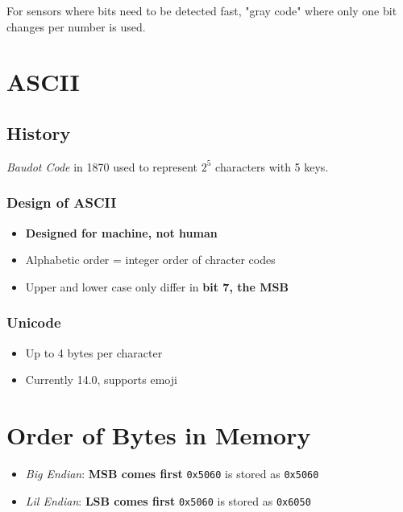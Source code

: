 \documentclass[11pt]{article}
\begin{document}
For sensors where bits need to be detected fast, "gray code" where only one bit changes per number is used.

\section{ASCII}
\label{sec:org69314f6}

\subsection{History}
\label{sec:orgac3f0a8}

\emph{Baudot Code} in 1870 used to represent \(2^5\) characters with 5 keys.

\subsubsection{Design of ASCII}
\label{sec:orgfc3d6bd}

\begin{itemize}
\item \textbf{Designed for machine, not human}
\item Alphabetic order = integer order of chracter codes
\item Upper and lower case only differ in \textbf{bit 7, the MSB}
\end{itemize}

\subsubsection{Unicode}
\label{sec:org38ed606}

\begin{itemize}
\item Up to 4 bytes per character
\item Currently 14.0, supports emoji
\end{itemize}

\section{Order of Bytes in Memory}
\label{sec:org2400e91}

\begin{itemize}
\item \emph{Big Endian}: \textbf{MSB comes first}
\texttt{0x5060} is stored as \texttt{0x5060}
\item \emph{Lil Endian}: \textbf{LSB comes first}
\texttt{0x5060} is stored as \texttt{0x6050}
\end{itemize}
\end{document}
